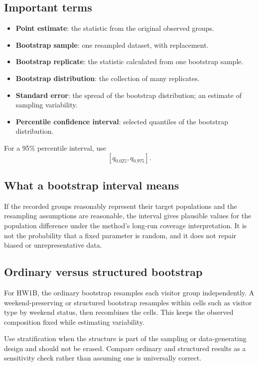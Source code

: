 \documentclass[11pt]{article}
\begin{document}
\subsection{Important terms}
\begin{itemize}
	\item \textbf{Point estimate}: the statistic from the original observed groups.
	\item \textbf{Bootstrap sample}: one resampled dataset, with replacement.
	\item \textbf{Bootstrap replicate}: the statistic calculated from one bootstrap sample.
	\item \textbf{Bootstrap distribution}: the collection of many replicates.
	\item \textbf{Standard error}: the spread of the bootstrap distribution; an estimate of sampling variability.
	\item \textbf{Percentile confidence interval}: selected quantiles of the bootstrap distribution.
\end{itemize}
For a 95\% percentile interval, use
\[
[q_{0.025},q_{0.975}].
\]

\subsection{What a bootstrap interval means}
If the recorded groups reasonably represent their target populations and the resampling assumptions are reasonable, the interval gives plausible values for the population difference under the method's long-run coverage interpretation. It is not the probability that a fixed parameter is random, and it does not repair biased or unrepresentative data.

\subsection{Ordinary versus structured bootstrap}
For HW1B, the ordinary bootstrap resamples each visitor group independently. A weekend-preserving or structured bootstrap resamples within cells such as visitor type by weekend status, then recombines the cells. This keeps the observed composition fixed while estimating variability.

Use stratification when the structure is part of the sampling or data-generating design and should not be erased. Compare ordinary and structured results as a sensitivity check rather than assuming one is universally correct.
\end{document}
